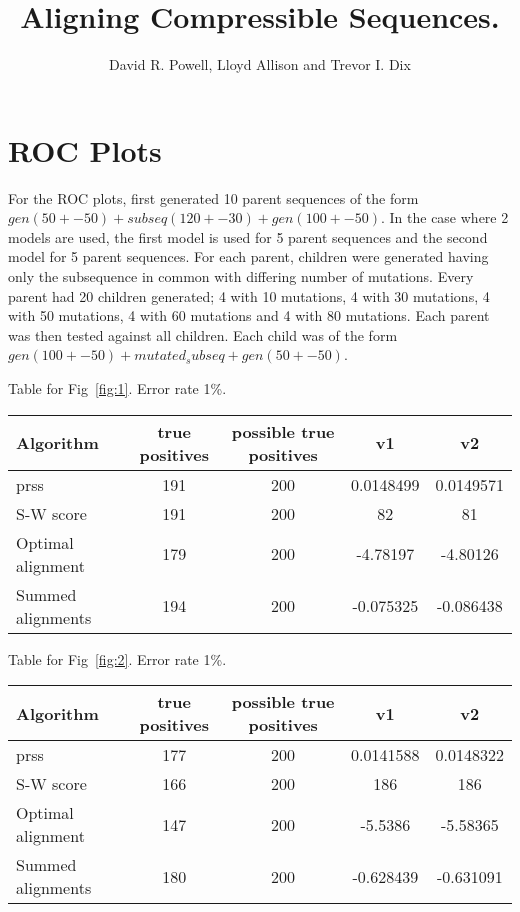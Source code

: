 \documentclass[a4paper,10pt,oneside]{article}
\begin{document}
\title{Aligning Compressible Sequences.}

\author{
  David R. Powell, Lloyd Allison and Trevor I. Dix \\
}

\date{}
\maketitle


\section{ROC Plots}

For the ROC plots, first generated 10 parent sequences of the form
$gen(50+-50) + subseq(120+-30) + gen(100+-50)$.  In the case where 2 models
are used, the first model is used for 5 parent sequences and the second model
for 5 parent sequences.  For each parent, children were generated having only
the subsequence in common with differing number of mutations.  Every parent
had 20 children generated; 4 with 10 mutations, 4 with 30 mutations, 4 with 50
mutations, 4 with 60 mutations and 4 with 80 mutations.  Each parent was then
tested against all children.  Each child was of the form $gen(100+-50) +
mutated_subseq + gen(50+-50)$.


Table for Fig~\ref{fig:1}. Error rate 1\%.
\begin{tabular}{|l|c|c|c|c|} \hline
Algorithm & true positives & possible true positives & v1 & v2 \\ \hline
prss & 191 & 200 & 0.0148499 & 0.0149571 \\
S-W score & 191 & 200 & 82 & 81 \\
Optimal alignment & 179 & 200 & -4.78197 & -4.80126 \\
Summed alignments & 194 & 200 & -0.075325 & -0.086438 \\\hline
\end{tabular}

Table for Fig~\ref{fig:2}. Error rate 1\%.
\begin{tabular}{|l|c|c|c|c|} \hline
Algorithm & true positives & possible true positives & v1 & v2 \\ \hline
prss & 177 & 200 & 0.0141588 & 0.0148322 \\
S-W score & 166 & 200 & 186 & 186 \\
Optimal alignment & 147 & 200 & -5.5386 & -5.58365 \\
Summed alignments & 180 & 200 & -0.628439 & -0.631091 \\\hline
\end{tabular}
\end{document}
